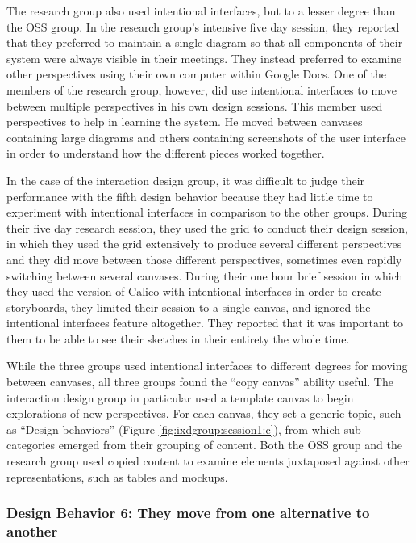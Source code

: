 \documentclass[12pt,fleqn]{ucithesis}
\begin{document}
The research group also used intentional interfaces, but to a lesser degree than the OSS group. In the research group's intensive five day session, they reported that they preferred to maintain a single diagram so that all components of their system were always visible in their meetings. They instead preferred to examine other perspectives using their own computer within Google Docs. One of the members of the research group, however, did use intentional interfaces to move between multiple perspectives in his own design sessions. This member used perspectives to help in learning the system. He moved between canvases containing large diagrams and others containing screenshots of the user interface in order to understand how the different pieces worked together. 

In the case of the interaction design group, it was difficult to judge their performance with the fifth design behavior because they had little time to experiment with intentional interfaces in comparison to the other groups. During their five day research session, they used the grid to conduct their design session, in which they used the grid extensively to produce several different perspectives and they did move between those different perspectives, sometimes even rapidly switching between several canvases. During their one hour brief session in which they used the version of Calico with intentional interfaces in order to create storyboards, they limited their session to a single canvas, and ignored the intentional interfaces feature altogether. They reported that it was important to them to be able to see their sketches in their entirety the whole time. 

While the three groups used intentional interfaces to different degrees for moving between canvases, all three groups found the ``copy canvas'' ability useful. The interaction design group in particular used a template canvas to begin explorations of new perspectives. For each canvas, they set a generic topic, such as ``Design behaviors'' (Figure \ref{fig:ixdgroup:session1:c}), from which sub-categories emerged from their grouping of content. Both the OSS group and the research group used copied content to examine elements juxtaposed against other representations, such as tables and mockups.


\subsubsection{Design Behavior 6: They move from one alternative to another}
\end{document}
